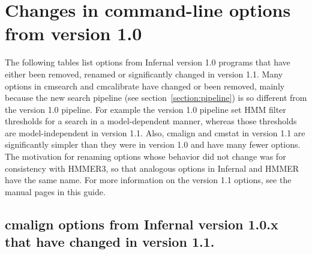 \section{Changes in command-line options from version 1.0}
\label{section:options}
\setcounter{footnote}{0}

The following tables list options from Infernal version 1.0 programs
that have either been removed, renamed or significantly changed in
version 1.1. Many options in cmsearch and cmcalibrate have changed or
been removed, mainly because the new search pipeline (see
section~\ref{section:pipeline}) is so different from the version 1.0
pipeline. For example the version 1.0 pipeline set HMM filter
thresholds for a search in a model-dependent manner, whereas those
thresholds are model-independent in version 1.1. Also, cmalign and
cmstat in version 1.1 are significantly simpler than they were in
version 1.0 and have many fewer options. The motivation for renaming
options whose behavior did not change was for consistency with
HMMER3, so that analogous options in Infernal and HMMER have the same
name. For more information on the version 1.1 options, see the manual
pages in this guide.

\subsection{cmalign options from Infernal version 1.0.x that have changed in version 1.1.} 

